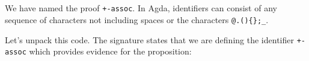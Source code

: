 \begin{fence}
\begin{code}
\>[4]\AgdaSymbol{(}\AgdaSpace{}%
\AgdaSpace{}%
\AgdaOperator{\AgdaPrimitive{+}}\AgdaSpace{}%
\AgdaSymbol{)}\AgdaSpace{}%
\AgdaOperator{\AgdaPrimitive{+}}\AgdaSpace{}%
\<%
\\
%
\>[2]\<%
\\
\>[2][@{}l@{\AgdaIndent{0}}]%
\>[4]\AgdaSpace{}%
\AgdaSymbol{(}\AgdaSpace{}%
\AgdaOperator{\AgdaPrimitive{+}}\AgdaSpace{}%
\AgdaSymbol{)}\AgdaSpace{}%
\AgdaOperator{\AgdaPrimitive{+}}\AgdaSpace{}%
\<%
\\
%
\>[2]\<%
\\
\>[2][@{}l@{\AgdaIndent{0}}]%
\>[4]\AgdaSpace{}%
\AgdaSymbol{((}\AgdaSpace{}%
\AgdaOperator{\AgdaPrimitive{+}}\AgdaSpace{}%
\AgdaSymbol{)}\AgdaSpace{}%
\AgdaOperator{\AgdaPrimitive{+}}\AgdaSpace{}%
\AgdaSymbol{)}\<%
\\
%
\>[2]\AgdaSpace{}%
\AgdaSpace{}%
\AgdaSpace{}%
\AgdaSymbol{(}\AgdaSpace{}%
\AgdaSpace{}%
\AgdaSpace{}%
\AgdaSymbol{)}\AgdaSpace{}%
\<%
\\
\>[2][@{}l@{\AgdaIndent{0}}]%
\>[4]\AgdaSpace{}%
\AgdaSymbol{(}\AgdaSpace{}%
\AgdaOperator{\AgdaPrimitive{+}}\AgdaSpace{}%
\AgdaSymbol{(}\AgdaSpace{}%
\AgdaOperator{\AgdaPrimitive{+}}\AgdaSpace{}%
\AgdaSymbol{))}\<%
\\
%
\>[2]\<%
\\
\>[2][@{}l@{\AgdaIndent{0}}]%
\>[4]\AgdaSpace{}%
\AgdaSpace{}%
\AgdaOperator{\AgdaPrimitive{+}}\AgdaSpace{}%
\AgdaSymbol{(}\AgdaSpace{}%
\AgdaOperator{\AgdaPrimitive{+}}\AgdaSpace{}%
\AgdaSymbol{)}\<%
\\
%
\>[2]\<%
\end{code}
\end{fence}

We have named the proof \texttt{+-assoc}. In Agda, identifiers can
consist of any sequence of characters not including spaces or the
characters \texttt{@.()\{\};\_}.

Let's unpack this code. The signature states that we are defining the
identifier \texttt{+-assoc} which provides evidence for the proposition:

